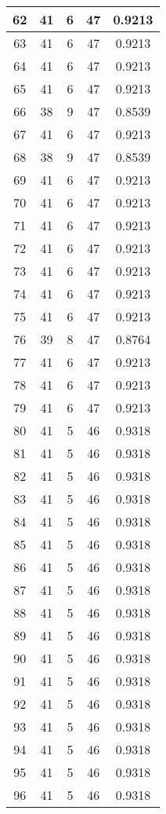 \documentclass[letterpaper, 12pt]{article}
\begin{document}
\begin{longtable}{|c|c|c|c|c|}
\hline
62 & 41 & 6 & 47 & 0.9213 \\
\hline
63 & 41 & 6 & 47 & 0.9213 \\
\hline
64 & 41 & 6 & 47 & 0.9213 \\
\hline
65 & 41 & 6 & 47 & 0.9213 \\
\hline
66 & 38 & 9 & 47 & 0.8539 \\
\hline
67 & 41 & 6 & 47 & 0.9213 \\
\hline
68 & 38 & 9 & 47 & 0.8539 \\
\hline
69 & 41 & 6 & 47 & 0.9213 \\
\hline
70 & 41 & 6 & 47 & 0.9213 \\
\hline
71 & 41 & 6 & 47 & 0.9213 \\
\hline
72 & 41 & 6 & 47 & 0.9213 \\
\hline
73 & 41 & 6 & 47 & 0.9213 \\
\hline
74 & 41 & 6 & 47 & 0.9213 \\
\hline
75 & 41 & 6 & 47 & 0.9213 \\
\hline
76 & 39 & 8 & 47 & 0.8764 \\
\hline
77 & 41 & 6 & 47 & 0.9213 \\
\hline
78 & 41 & 6 & 47 & 0.9213 \\
\hline
79 & 41 & 6 & 47 & 0.9213 \\
\hline
80 & 41 & 5 & 46 & 0.9318 \\
\hline
81 & 41 & 5 & 46 & 0.9318 \\
\hline
82 & 41 & 5 & 46 & 0.9318 \\
\hline
83 & 41 & 5 & 46 & 0.9318 \\
\hline
84 & 41 & 5 & 46 & 0.9318 \\
\hline
85 & 41 & 5 & 46 & 0.9318 \\
\hline
86 & 41 & 5 & 46 & 0.9318 \\
\hline
87 & 41 & 5 & 46 & 0.9318 \\
\hline
88 & 41 & 5 & 46 & 0.9318 \\
\hline
89 & 41 & 5 & 46 & 0.9318 \\
\hline
90 & 41 & 5 & 46 & 0.9318 \\
\hline
91 & 41 & 5 & 46 & 0.9318 \\
\hline
92 & 41 & 5 & 46 & 0.9318 \\
\hline
93 & 41 & 5 & 46 & 0.9318 \\
\hline
94 & 41 & 5 & 46 & 0.9318 \\
\hline
95 & 41 & 5 & 46 & 0.9318 \\
\hline
96 & 41 & 5 & 46 & 0.9318 \\

\end{longtable}
\end{document}
